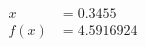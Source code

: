 \documentclass[preview]{standalone}
\begin{document}
\begin{align*}
x &= 0.3455\\f(x) &= 4.5916924
\end{align*}
\end{document}
